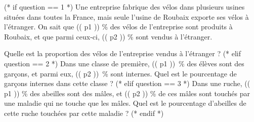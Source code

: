
\exercice

    (* if question == 1 *)
    Une entreprise fabrique des vélos dans plusieurs usines situées dans toutes la France, mais seule l'usine de Roubaix exporte ses vélos à l'étranger. On sait que (( p1 )) \% des vélos de l'entreprise sont produits à Roubaix, et que parmi ceux-ci, (( p2 )) \% sont vendus à l'étranger.

    Quelle est la proportion des vélos de l'entreprise vendus à l'étranger ?
    (* elif question == 2 *)
    Dans une classe de première, (( p1 ))~\% des élèves sont des garçons, et parmi eux, (( p2 ))~\% sont internes. Quel est le pourcentage de garçons internes dans cette classe ?
    (* elif question == 3 *)
    Dans une ruche, (( p1 )) \% des abeilles sont des mâles, et (( p2 )) \% de ces mâles sont touchés par une maladie qui ne touche que les mâles. Quel est le pourcentage d'abeilles de cette ruche touchées par cette maladie ?
    (* endif *)
